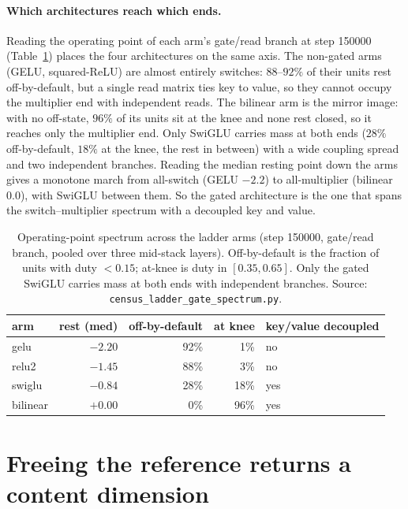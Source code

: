 \documentclass[11pt]{article}
\begin{document}
\paragraph{Which architectures reach which ends.}
Reading the operating point of each arm's gate/read branch at step 150000
(Table~\ref{tab:spectrum}) places the four architectures on the same axis. The
non-gated arms (GELU, squared-ReLU) are almost entirely switches: $88$--$92\%$ of
their units rest off-by-default, but a single read matrix ties key to value, so
they cannot occupy the multiplier end with independent reads. The bilinear arm is
the mirror image: with no off-state, $96\%$ of its units sit at the knee and none
rest closed, so it reaches only the multiplier end. Only SwiGLU carries mass at
both ends ($28\%$ off-by-default, $18\%$ at the knee, the rest in between) with a
wide coupling spread and two independent branches. Reading the median resting
point down the arms gives a monotone march from all-switch (GELU $-2.2$) to
all-multiplier (bilinear $0.0$), with SwiGLU between them. So the gated
architecture is the one that spans the switch--multiplier spectrum with a
decoupled key and value.

\begin{table}[t]
\centering\small
\begin{tabular}{lrrrl}
\toprule
arm & rest (med) & off-by-default & at knee & key/value decoupled \\
\midrule
gelu     & $-2.20$ & 92\% &  1\% & no \\
relu2    & $-1.45$ & 88\% &  3\% & no \\
swiglu   & $-0.84$ & 28\% & 18\% & yes \\
bilinear & $+0.00$ &  0\% & 96\% & yes \\
\bottomrule
\end{tabular}
\caption{Operating-point spectrum across the ladder arms (step 150000, gate/read
branch, pooled over three mid-stack layers). Off-by-default is the fraction of
units with duty $<0.15$; at-knee is duty in $[0.35,0.65]$. Only the gated SwiGLU
carries mass at both ends with independent branches. Source:
\texttt{census\_ladder\_gate\_spectrum.py}.}
\label{tab:spectrum}
\end{table}

\section{Freeing the reference returns a content dimension}
\label{sec:capacity}
\end{document}
